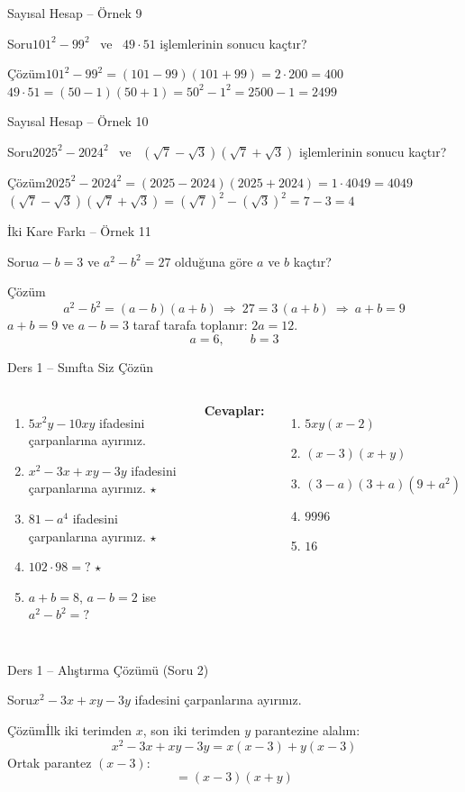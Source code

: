 \documentclass[aspectratio=169,11pt,handout]{beamer}
\newcommand{\soru}[3]{%
\begin{frame}{#1}
  \begin{block}{Soru}\large #2\end{block}
  \pause
  \begin{exampleblock}{Çözüm}\large #3\end{exampleblock}
\end{frame}}
\begin{document}
\soru{Sayısal Hesap -- Örnek 9}
{\(101^2-99^2\) \ ve \ \(49\cdot 51\) işlemlerinin sonucu kaçtır?}
{\(101^2-99^2=(101-99)(101+99)=2\cdot 200=400\)\\[4pt]
\(49\cdot 51=(50-1)(50+1)=50^2-1^2=2500-1=2499\)}

\soru{Sayısal Hesap -- Örnek 10}
{\(2025^2-2024^2\) \ ve \ \((\sqrt{7}-\sqrt{3})(\sqrt{7}+\sqrt{3})\) işlemlerinin sonucu kaçtır?}
{\(2025^2-2024^2=(2025-2024)(2025+2024)=1\cdot 4049=4049\)\\[4pt]
\((\sqrt{7}-\sqrt{3})(\sqrt{7}+\sqrt{3})=(\sqrt{7})^2-(\sqrt{3})^2=7-3=4\)}

\soru{İki Kare Farkı -- Örnek 11}
{\(a-b=3\) ve \(a^2-b^2=27\) olduğuna göre \(a\) ve \(b\) kaçtır?}
{\[a^2-b^2=(a-b)(a+b)\ \Rightarrow\ 27=3\,(a+b)\ \Rightarrow\ a+b=9\]
\(a+b=9\) ve \(a-b=3\) taraf tarafa toplanır: \(2a=12\).
\[a=6,\qquad b=3\]}

\begin{frame}{Ders 1 -- Sınıfta Siz Çözün}
\begin{columns}[t]
\begin{enumerate}
\item \(5x^2y-10xy\) ifadesini çarpanlarına ayırınız.
\item \(x^2-3x+xy-3y\) ifadesini çarpanlarına ayırınız. \(\star\)
\item \(81-a^4\) ifadesini çarpanlarına ayırınız. \(\star\)
\item \(102\cdot 98=?\) \(\star\)
\item \(a+b=8\), \(a-b=2\) ise \(a^2-b^2=?\)
\end{enumerate}
\pause
\textbf{Cevaplar:}
\begin{enumerate}
\item \(5xy(x-2)\)
\item \((x-3)(x+y)\)
\item \((3-a)(3+a)(9+a^2)\)
\item \(9996\)
\item \(16\)
\end{enumerate}
\end{columns}
\vspace{4pt}{\footnotesize \(\star\) işaretli soruların adım adım çözümü sonraki slaytlardadır.}
\end{frame}

\soru{Ders 1 -- Alıştırma Çözümü (Soru 2)}
{\(x^2-3x+xy-3y\) ifadesini çarpanlarına ayırınız.}
{İlk iki terimden \(x\), son iki terimden \(y\) parantezine alalım:
\[x^2-3x+xy-3y=x(x-3)+y(x-3)\]
Ortak parantez \((x-3)\):
\[=(x-3)(x+y)\]}
\end{document}
